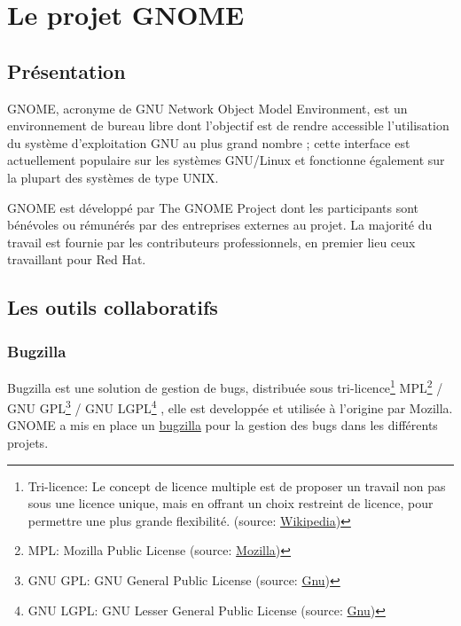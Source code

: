 \documentclass[12pt]{report}
\begin{document}
\chapter{Le projet GNOME}
\section{Présentation}
GNOME, acronyme de GNU Network Object Model Environment, est un
environnement de bureau libre  dont l'objectif est de rendre
accessible l'utilisation du système d'exploitation GNU au plus grand
nombre ; cette interface est actuellement populaire sur les systèmes
GNU/Linux et fonctionne également sur la plupart des systèmes de type
UNIX.

GNOME est développé par The GNOME Project dont les participants sont
bénévoles ou rémunérés par des entreprises externes au projet. La
majorité du travail est fournie par les contributeurs professionnels,
en premier lieu ceux travaillant pour Red Hat.

\section{Les outils collaboratifs} 
\subsection{Bugzilla}
\label{bugzilla}
Bugzilla est une solution de gestion de bugs, distribuée sous
tri-licence\footnote{Tri-licence: Le concept de licence multiple
  est de proposer un travail non pas sous une licence unique, mais
  en offrant un choix restreint de licence, pour permettre une plus
  grande flexibilité. (source:
  \href{https://fr.wikipedia.org/wiki/Licence_multiple}{Wikipedia})}
MPL\footnote{MPL: Mozilla Public License (source:
  \href{https://www.mozilla.org/en-US/MPL/}{Mozilla})}
/ GNU GPL\footnote{GNU GPL: GNU General Public License (source:
  \href{https://www.gnu.org/licenses/gpl.html}{Gnu})}
/ GNU LGPL\footnote{GNU LGPL: GNU Lesser General Public License (source:
  \href{https://www.gnu.org/licenses/lgpl.html}{Gnu})}
, elle est developpée et utilisée à l'origine par Mozilla.
GNOME a mis en place un \href{https://bugzilla.gnome.org}{bugzilla} pour 
la gestion des bugs dans les différents projets.
\end{document}
